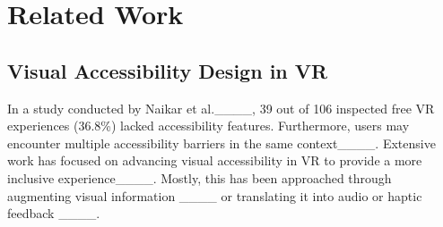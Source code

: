 \section{Related Work}
\subsection{Visual Accessibility Design in VR}

In a study conducted by Naikar et al.____, 39 out of 106 inspected free VR experiences (36.8\%) lacked accessibility features. Furthermore, users may encounter multiple accessibility barriers in the same context____. Extensive work has focused on advancing visual accessibility %
in VR to provide a more inclusive experience____. Mostly, this has been approached through augmenting visual information ____ or translating it into audio or haptic feedback ____. 


